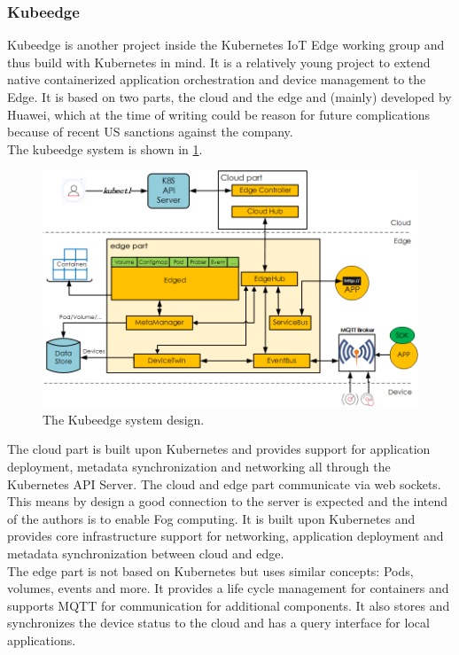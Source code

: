 \subsubsection{Kubeedge}
Kubeedge is another project inside the Kubernetes IoT Edge working group and thus build with Kubernetes in mind. It is a relatively young project to extend native containerized application orchestration and device management to the Edge. It is based on two parts, the cloud and the edge and (mainly) developed by Huawei, which at the time of writing could be reason for future complications because of recent US sanctions against the company.\\
The kubeedge system is shown in \cref{fig:kubeedgeStruct}.
\begin{figure}[h!]
    \centering
    \includegraphics[width=(\textwidth+4cm)/2]{figures/kubeedge_arch.png}
    \caption{The Kubeedge system design.}
    \label{fig:kubeedgeStruct}
\end{figure}
The cloud part is built upon Kubernetes and provides support for application deployment, metadata synchronization and networking all through the Kubernetes API Server. The cloud and edge part communicate via web sockets. This means by design a good connection to the server is expected and the intend of the authors is to enable Fog computing. It is built upon Kubernetes and provides core infrastructure support for networking, application deployment and metadata synchronization between cloud and edge.\\
The edge part is not based on Kubernetes but uses similar concepts: Pods, volumes, events and more. It provides a life cycle management for containers and supports MQTT for communication for additional components. It also stores and synchronizes the device status to the cloud and has a query interface for local applications.

